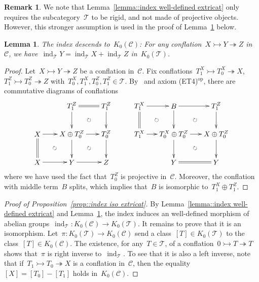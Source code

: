 \documentclass{amsart}
\newtheorem{lemma}[theorem]{Lemma}
\theoremstyle{definition}
\newtheorem{remark}[theorem]{Remark}
\newcommand{\cat}{\mathcal{C}}
\newcommand{\ind}{\operatorname{ind}}
\newcommand{\tc}{\mathcal{T}}
\newcommand{\infl}{\rightarrowtail}
\newcommand{\defl}{\twoheadrightarrow}
\newcommand{\kzero}[1]{K_0(#1)}
\begin{document}
\begin{remark}
We note that Lemma~\ref{lemma::index well-defined extricat} only requires the subcategory~$\tc$ to be rigid, and not made of projective objects.
However, this stronger assumption is used in the proof of Lemma~\ref{lemma::index kzero extricat} below.
\end{remark}

\begin{lemma}\label{lemma::index kzero extricat}
 The index descends to~$\kzero{\cat}$: For any conflation~$X\infl Y\defl Z$ in~$\cat$, we have~$\ind_\tc Y = \ind_\tc X + \ind_\tc Z$ in~$\kzero{\tc}$.
\end{lemma}

\begin{proof}
Let~$X\infl Y\defl Z$ be a conflation in~$\cat$.
Fix conflations~$T_1^X \infl T_0^X \defl X$,~$T_1^Z\infl T_0^Z \defl Z$ with~$T_0^X, T_1^X, T_0^Z, T_1^Z\in\tc$.
By~\cite[Proposition 3.15]{NakaokaPalu} and axiom (ET4)$^{\mathrm{op}}$, there are commutative diagrams of conflations
\[
\xy
%
(-7,21)*+{T^Z_1}="-12";
(10,21)*+{T^Z_1}="-14";
%
(-24,7)*+{X}="0";
(-7,7)*+{X\oplus T^Z_0}="2";
(10,7)*+{T^Z_0}="4";
%
(-24,-7)*+{X}="10";
(-7,-7)*+{Y}="12";
(10,-7)*+{Z}="14";
%
{\ar@{=} "-12";"-14"};
%
{\ar "-12";"2"};
{\ar "-14";"4"};
%
{\ar "0";"2"};
{\ar "2";"4"};
%
{\ar@{=} "0";"10"};
{\ar "2";"12"};
{\ar "4";"14"};
%
{\ar "10";"12"};
{\ar "12";"14"};
%
{\ar@{}|\circlearrowright "-12";"4"};
{\ar@{}|\circlearrowright "0";"12"};
{\ar@{}|\circlearrowright "2";"14"};
\endxy
\ \ \ \ \ \ \ \
\xy
(-24,21)*+{T^X_1}="0";
(-7,21)*+{B}="2";
(14,21)*+{T^Z_1}="4";
%
(-24,7)*+{T^X_1}="10";
(-7,7)*+{T^X_0\oplus T^Z_0}="12";
(14,7)*+{X\oplus T^Z_0}="14";
%
(-7,-7)*+{Y}="22";
(14,-7)*+{Y}="24";
%
%
{\ar "0";"2"};
{\ar "2";"4"};
%
{\ar@{=} "0";"10"};
{\ar "2";"12"};
{\ar "4";"14"};
%
{\ar "10";"12"};
{\ar "12";"14"};
%
{\ar "12";"22"};
{\ar "14";"24"};
%
{\ar@{=} "22";"24"};
%
{\ar@{}|\circlearrowright "0";"12"};
{\ar@{}|\circlearrowright "2";"14"};
{\ar@{}|\circlearrowright "12";"24"};
\endxy
\]
where we have used the fact that~$T_0^Z$ is projective in~$\cat$.
Moreover, the conflation with middle term~$B$ splits, which implies that~$B$ is isomorphic to~$T_1^X\oplus T_1^Z$.
\end{proof}

\begin{proof}[Proof of Proposition~\ref{prop::index iso extricat}]
 By Lemma~\ref{lemma::index well-defined extricat} and Lemma~\ref{lemma::index kzero extricat}, the index induces an well-defined morphism of abelian groups~$\ind_\tc:\kzero{\cat}\to\kzero{\tc}$.
 It remains to prove that it is an isomorphism.
 Let~$\pi:\kzero{\tc}\to\kzero{\cat}$ send a class~$[T]\in\kzero{\tc}$ to the class~$[T]\in\kzero{\cat}$.
 The existence, for any~$T\in\tc$, of a conflation~$0\infl T\defl T$ shows that~$\pi$ is right inverse to~$\ind_\tc$.
 To see that it is also a left inverse, note that if~$T_1\infl T_0\defl X$ is a conflation in~$\cat$, then the equality~$[X]=[T_0]-[T_1]$ holds in~$\kzero{\cat}$.
\end{proof}
\end{document}

